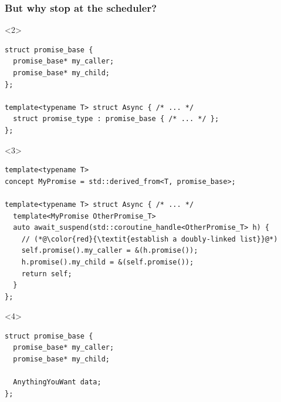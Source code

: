 \documentclass[aspectratio=169]{beamer}
\begin{document}
\fi

\begin{frame}[fragile]
  \frametitle{But why stop at the scheduler?}
  
  \begin{onlyenv}<2>
  \begin{lstlisting}[style=cpp20]
struct promise_base {
  promise_base* my_caller;
  promise_base* my_child;
};

template<typename T> struct Async { /* ... */
  struct promise_type : promise_base { /* ... */ };
};
  \end{lstlisting}
  \end{onlyenv}
  
  \begin{onlyenv}<3>
  \begin{lstlisting}[style=cpp20]
template<typename T>
concept MyPromise = std::derived_from<T, promise_base>;

template<typename T> struct Async { /* ... */
  template<MyPromise OtherPromise_T>
  auto await_suspend(std::coroutine_handle<OtherPromise_T> h) {
    // (*@\color{red}{\textit{establish a doubly-linked list}}@*)
    self.promise().my_caller = &(h.promise());
    h.promise().my_child = &(self.promise());
    return self;
  }
};
  \end{lstlisting}
  \end{onlyenv}
  
  \begin{onlyenv}<4>
  \begin{lstlisting}[style=cpp20]
struct promise_base {
  promise_base* my_caller;
  promise_base* my_child;
  
  AnythingYouWant data;
};
  \end{lstlisting}
  \end{onlyenv}
  
  \note { \color{green}{TIME!} \color{black}{0:40} }
\end{frame}
\end{document}
